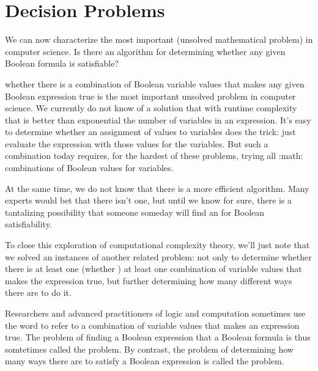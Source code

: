 \documentclass[letterpaper,10pt,english]{sphinxmanual}
\begin{document}
\section{Decision Problems}
\label{\detokenize{08-propositional-logic:decision-problems}}
We can now characterize the most important  (unsolved
mathematical problem) in computer science.  Is there an 
algorithm for determining whether any given Boolean formula is
satisfiable?

whether there is a combination of Boolean
variable values that makes any given Boolean expression true is the
most important unsolved problem in computer science. We currently do
not know of a solution that with runtime complexity that is better
than exponential the number of variables in an expression.  It’s easy
to determine whether an assignment of values to variables does the
trick: just evaluate the expression with those values for the
variables. But  such a combination today requires, for the
hardest of these problems, trying all :math: combinations of
Boolean values for  variables.

At the same time, we do not know that there is  a more efficient
algorithm. Many experts would bet that there isn’t one, but until we
know for sure, there is a tantalizing possibility that someone someday
will find an  for Boolean satisfiability.

To close this exploration of computational complexity theory, we’ll
just note that we solved an instances of another related problem: not
only to determine whether there is at least one (whether ) at least one combination of variable values that makes the
expression true, but further determining how many different ways there
are to do it.

Researchers and advanced practitioners of logic and computation
sometimes use the word  to refer to a combination of variable
values that makes an expression true. The problem of finding a Boolean
expression that  a Boolean formula is thus somtetimes
called the  problem. By contrast, the problem of
determining how many ways there are to satisfy a Boolean expression is
called the  problem.
\end{document}
